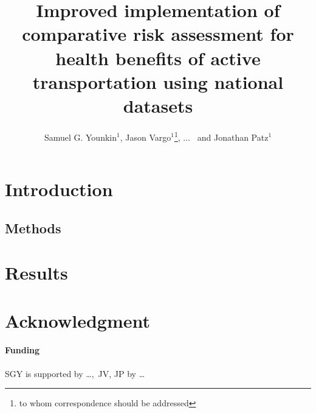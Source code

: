 \documentclass{bioinfo}
\newcommand{\package}{\emph{ITHIM}}
\begin{document}

\title[\package{}]{Improved implementation of comparative risk
  assessment for health benefits of active transportation using
  national datasets}
\author[Younkin \textit{et~al}]{Samuel G. Younkin$^{1}$,
  Jason Vargo$^{1}$\footnote{to whom correspondence should be addressed},
  $\ldots$
  \ and Jonathan Patz$^{1}$}
\address{$^{1}$Global Health Institute\\
University of Wisconsin{\textendash}Madison, Madison, WI USA\\
}


\maketitle

\begin{abstract}


\end{abstract}

\section{Introduction}



\begin{methods}

\section{Methods}



\end{methods}




\section{Results}


\section*{Acknowledgment}
\paragraph{Funding\textcolon} SGY is supported by \ldots,\ JV, JP by \ldots

%

%

\end{document}

